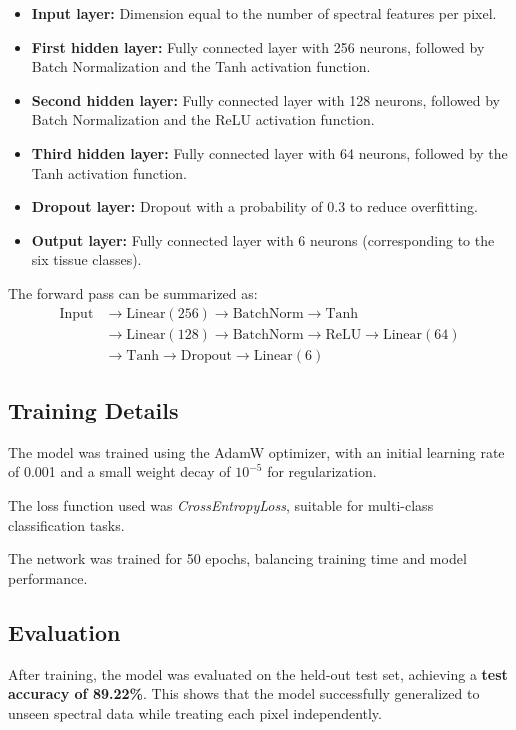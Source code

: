 \documentclass[fleqn,moreauthors,10pt]{ds_report}
\begin{document}
\begin{itemize}
    \item \textbf{Input layer:} Dimension equal to the number of spectral features per pixel.
    \item \textbf{First hidden layer:} Fully connected layer with 256 neurons, followed by Batch Normalization and the Tanh activation function.
    \item \textbf{Second hidden layer:} Fully connected layer with 128 neurons, followed by Batch Normalization and the ReLU activation function.
    \item \textbf{Third hidden layer:} Fully connected layer with 64 neurons, followed by the Tanh activation function.
    \item \textbf{Dropout layer:} Dropout with a probability of 0.3 to reduce overfitting.
    \item \textbf{Output layer:} Fully connected layer with 6 neurons (corresponding to the six tissue classes).
\end{itemize}

\noindent
The forward pass can be summarized as:
\begin{align*}
\text{Input} &\rightarrow \text{Linear}(256) \rightarrow \text{BatchNorm} \rightarrow \text{Tanh} \\
&\rightarrow \text{Linear}(128) \rightarrow \text{BatchNorm} \rightarrow \text{ReLU} \rightarrow \text{Linear}(64) \\
&\rightarrow \text{Tanh} \rightarrow \text{Dropout} \rightarrow \text{Linear}(6)
\end{align*}


\subsection{Training Details}
The model was trained using the AdamW optimizer, with an initial learning rate of 0.001 and a small weight decay of $10^{-5}$ for regularization.

The loss function used was \textit{CrossEntropyLoss}, suitable for multi-class classification tasks.

The network was trained for 50 epochs, balancing training time and model performance.

\subsection{Evaluation}
After training, the model was evaluated on the held-out test set, achieving a \textbf{test accuracy of 89.22\%}. This shows that the model successfully generalized to unseen spectral data while treating each pixel independently.
\end{document}
